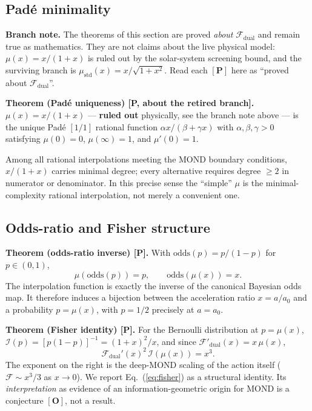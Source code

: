 \documentclass[aps,prd,preprint,superscriptaddress,nofootinbib,amsmath,amssymb,floatfix]{revtex4-2}
\makeatletter
\DeclareRobustCommand{\_}{%
    \ifmmode\nfss@text{\textunderscore}\else\textunderscore\penalty\z@\fi}%
\makeatother
\begin{document}
\subsection{Pad\'e minimality}

\medskip\noindent\textbf{Branch note.} The theorems of this section are proved
\emph{about} $\mathcal{F}_{\text{dual}}$ and remain true as mathematics. They are
not claims about the live physical model: $\mu(x) = x/(1+x)$ is ruled out by the
solar-system screening bound, and the surviving branch is
$\mu_{\text{std}}(x) = x/\sqrt{1+x^2}$. Read each $\mathbf{[P]}$ here as
``proved about $\mathcal{F}_{\text{dual}}$''.\medskip

\textbf{Theorem (Pad\'e uniqueness) [P, about the retired branch].} $\mu(x) = x/(1+x)$ — \textbf{ruled out} physically, see the branch note above — is the unique Pad\'e $[1/1]$ rational function $\alpha x/(\beta + \gamma x)$ with $\alpha,\beta,\gamma>0$ satisfying $\mu(0)=0$, $\mu(\infty)=1$, and $\mu'(0)=1$.

Among all rational interpolations meeting the MOND boundary conditions, $x/(1+x)$ carries minimal degree; every alternative requires degree $\ge 2$ in numerator or denominator. In this precise sense the ``simple'' $\mu$ is the minimal-complexity rational interpolation, not merely a convenient one.

\subsection{Odds-ratio and Fisher structure}

\textbf{Theorem (odds-ratio inverse) [P].} With $\text{odds}(p) = p/(1-p)$ for $p\in(0,1)$,
\begin{equation}
\mu(\text{odds}(p)) = p, \qquad \text{odds}(\mu(x)) = x .
\end{equation}
The interpolation function is exactly the inverse of the canonical Bayesian odds map. It therefore induces a bijection between the acceleration ratio $x = a/a_0$ and a probability $p = \mu(x)$, with $p = 1/2$ precisely at $a = a_0$.

\textbf{Theorem (Fisher identity) [P].} For the Bernoulli distribution at $p = \mu(x)$, $\mathcal{I}(p) = [p(1-p)]^{-1} = (1+x)^2/x$, and since $\mathcal{F}'_{\text{dual}}(x) = x\,\mu(x)$,
\begin{equation}
\label{eq:fisher}
\mathcal{F}_{\text{dual}}'(x)^2\,\mathcal{I}(\mu(x)) = x^3 .
\end{equation}
The exponent on the right is the deep-MOND scaling of the action itself ($\mathcal{F}\sim x^3/3$ as $x\to0$). We report Eq.~(\ref{eq:fisher}) as a structural identity. Its \emph{interpretation} as evidence of an information-geometric origin for MOND is a conjecture $\mathbf{[O]}$, not a result.
\end{document}

